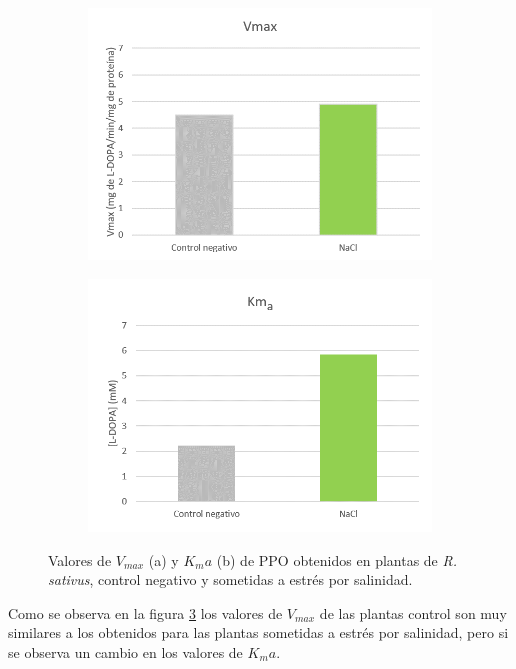 \pagebreak

\begin{figure}[h!!!!]
	\begin{subfigure}{.5\textwidth}
		\centering
		\includegraphics[width=.91\linewidth]{Imagenes/Vmax}
		\caption{}
		\label{1}
	\end{subfigure}
	\begin{subfigure}{.5\textwidth}
		\centering
		\includegraphics[width=.99\linewidth]{Imagenes/Km}
		\caption{}
		\label{2}
	\end{subfigure}
	\caption{Valores de $V_{max}$ (a) y $K_ma$ (b) de PPO obtenidos en plantas de \textit{R. sativus}, control negativo y sometidas a estr\'es por salinidad.}
	\label{PObarra}
\end{figure}

\medskip
\medskip

Como se observa en la figura \ref{PObarra} los valores de $V_{max}$ de las plantas control son muy similares a los obtenidos para las plantas sometidas a estr\'es por salinidad, pero si se observa un cambio en los valores de $K_ma$.
